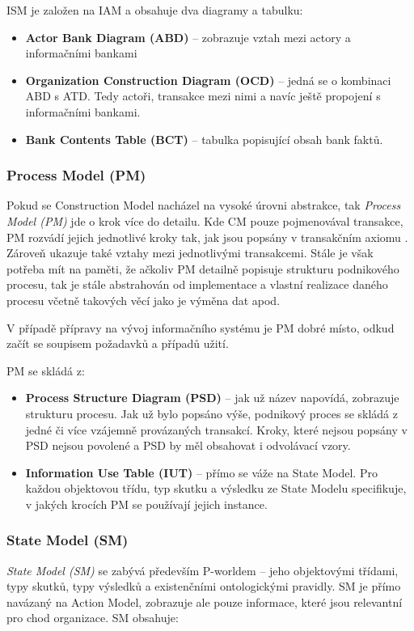 ISM je založen na IAM a obsahuje dva diagramy a tabulku:

\begin{itemize}
\item \textbf{Actor Bank Diagram (ABD)} – zobrazuje vztah mezi actory a informačními bankami
\item \textbf{Organization Construction Diagram (OCD)} – jedná se o kombinaci ABD s ATD. Tedy actoři, transakce mezi nimi a navíc ještě propojení s informačními bankami.
\item \textbf{Bank Contents Table (BCT)} – tabulka popisující obsah bank faktů.
\end{itemize}

\subsubsection{Process Model (PM)}
Pokud se Construction Model nacházel na vysoké úrovni abstrakce, tak \textit{Process Model (PM)} jde o krok více do detailu. Kde CM pouze pojmenovával transakce, PM rozvádí jejich jednotlivé kroky tak, jak jsou popsány v transakčním axiomu \ptheory{}. Zároveň ukazuje také vztahy mezi jednotlivými transakcemi. Stále je však potřeba mít na paměti, že ačkoliv PM detailně popisuje strukturu podnikového procesu, tak je stále abstrahován od implementace a vlastní realizace daného procesu včetně takových věcí jako je výměna dat apod.

V případě přípravy na vývoj informačního systému je PM dobré místo, odkud začít se soupisem požadavků a případů užití.


PM se skládá z:

\begin{itemize}
\item \textbf{Process Structure Diagram (PSD)} – jak už název napovídá, zobrazuje strukturu procesu. Jak už bylo popsáno výše, podnikový proces se skládá z jedné či více vzájemně provázaných transakcí. Kroky, které nejsou popsány v PSD nejsou povolené a PSD by měl obsahovat i odvolávací vzory.
\item \textbf{Information Use Table (IUT)} – přímo se váže na State Model. Pro každou objektovou třídu, typ skutku a výsledku ze State Modelu specifikuje, v jakých krocích PM se používají jejich instance. 
\end{itemize}

\subsubsection{State Model (SM)}
\textit{State Model (SM)} se zabývá především P-worldem – jeho objektovými třídami, typy skutků, typy výsledků a existenčními ontologickými pravidly. SM je přímo navázaný na Action Model, zobrazuje ale pouze informace, které jsou relevantní pro chod organizace. SM obsahuje:

